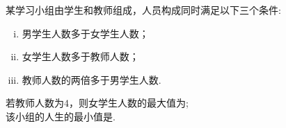 \documentclass{BHCexam}
\begin{document}
\begin{questions}
\qs 某学习小组由学生和教师组成，人员构成同时满足以下三个条件:\\
\begin{enumerate}[(i)]
\item 男学生人数多于女学生人数；
\item 女学生人数多于教师人数；
\item 教师人数的两倍多于男学生人数.
\end{enumerate}
 若教师人数为$ 4 $，则女学生人数的最大值为\tk;\\
 该小组的人生的最小值是\tk.

\end{questions}
\newpage
\end{document}
